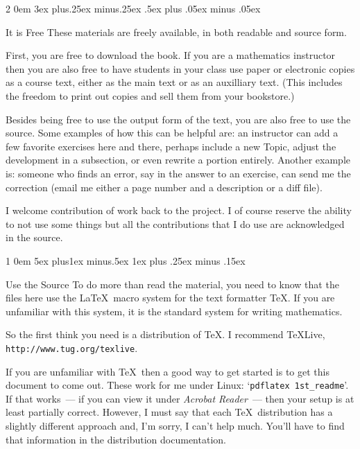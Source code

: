 \documentclass[titlepage]{article}
\makeatletter
\renewcommand{\section}{\@startsection{section}%
  {1}%
  {0em}%
  {5ex plus1ex minus.5ex}%
  {1ex plus .25ex minus .15ex}%
  {\large\bfseries\raggedright}}
\renewcommand{\subsection}{\@startsection{subsection}%
  {2}%
  {0em}%
  {3ex plus.25ex minus.25ex}%
  {.5ex plus .05ex minus .05ex}%
  {\bfseries\raggedright}}
\makeatother
\begin{document}
\subsection{It is Free}
These materials are freely available, in both readable and source form.

First, you are free to download the book.
If you are a mathematics
instructor then you are also free to have students in your class 
use paper or electronic copies as a course text,
either as the main text or as an auxilliary text. 
(This includes the freedom to print out copies and sell them
from your bookstore.)

Besides being free to use the output form of the text, you are
also free to use the source.
Some examples of how this can be helpful are:
an instructor can add a few favorite exercises 
here and there, perhaps include a new Topic, adjust the development
in a subsection, or even rewrite a portion entirely.
Another example is: someone who finds an error, say in the answer to an
exercise, can send me the correction (email me either a page number and a
description or a diff file).

I welcome contribution of work back to the project.
I of course reserve the ability to not use some things but all
the contributions that I do use are acknowledged in the source.














\section{Use the Source}
To do more than read the material, 
you need to know that the files here
use the \LaTeX\ macro system for the text formatter \TeX. 
If you are unfamiliar with this system, it is the 
standard system for writing mathematics.

So the first think you need is a
distribution of \TeX. 
I recommend \TeX{}Live, \texttt{http://www.tug.org/texlive}. 

If you are unfamiliar with \TeX\ then 
a good way to get started is to get this document to come out.  
These work for me under Linux:
`\verb!pdflatex 1st_readme!'. 
If that works~--- if you can view it under \textit{Acrobat Reader}~--- then 
your setup is at least partially correct. 
However, I must say that each \TeX\ distribution 
has a slightly different approach and, I'm sorry, I can't help much.
You'll have to find that information in the distribution
documentation.
\end{document}
